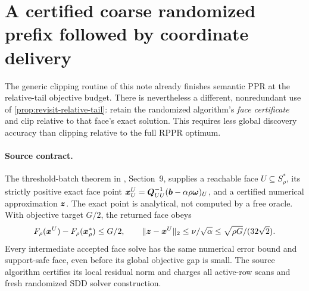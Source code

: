 \section{A certified coarse randomized prefix followed by coordinate delivery}
\label{sec:revisit-randomized-handoff}
The generic clipping routine of this note already finishes semantic PPR at
the relative-tail objective budget. There is nevertheless a different,
nonredundant use of \cref{prop:revisit-relative-tail}: retain the randomized
algorithm's \emph{face certificate} and clip relative to that face's exact
solution. This requires less global discovery accuracy than clipping
relative to the full RPPR optimum.

\paragraph{Source contract.}
The threshold-batch theorem in
, Section~9, supplies a reachable face
$U\subseteq S_\rho^*$, its strictly positive exact face point
$\bm{x}^U_U=\bm{Q}_{UU}^{-1}(\bm{b}-\alpha\rho\bm{\omega})_U$, and a certified
numerical approximation $\bm{z}$. The exact point is analytical, not computed
by a free oracle. With objective target $G/2$, the returned face obeys
\[
 F_\rho(\bm{x}^U)-F_\rho(\bm{x}_\rho^*)\leq G/2,
 \qquad
 \|\bm{z}-\bm{x}^U\|_2\leq\nu/\sqrt\alpha
                 \leq\sqrt{\rho G}/(32\sqrt2).
\]
Every intermediate accepted face solve has the same numerical error bound
and support-safe face, even before its global objective gap is small.
The source algorithm certifies its local residual norm and charges all
active-row scans and fresh randomized SDD solver construction.

